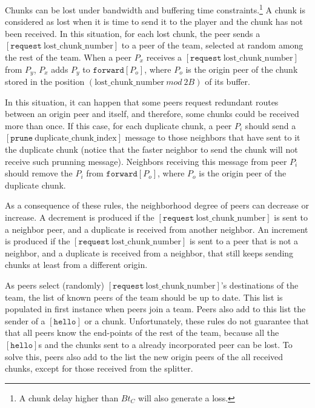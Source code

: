 

\label{sec:routes_discovery}

Chunks can be lost under bandwidth and buffering time
constraints.\footnote{A chunk delay higher than $Bt_C$ will also
  generate a loss.} A chunk is considered as lost when it is time to
send it to the player and the chunk has not been received.  In this
situation, for each lost chunk, the peer sends a
$[\mathtt{request}~\text{lost\_chunk\_number}]$ to a peer of the team,
selected at random among the rest of the team. When a peer $P_x$
receives a $[\mathtt{request}~\text{lost\_chunk\_number}]$ from $P_y$,
$P_x$ adds $P_y$ to $\mathtt{forward}[P_o]$, where $P_o$ is the origin
peer of the chunk stored in the position
$(\text{lost\_chunk\_number}~\mathit{mod}~2B)$ of its buffer.

In this situation, it can happen that some peers request redundant
routes between an origin peer and itself, and therefore, some chunks
could be received more than once. If this case, for each duplicate
chunk, a peer $P_i$ should send a
$[\mathtt{prune}~\text{duplicate\_chunk\_index}]$ message to those
neighbors that have sent to it the duplicate chunk (notice that the
faster neighbor to send the chunk will not receive such prunning
message). Neighbors receiving this message from peer $P_i$ should
remove the $P_i$ from $\mathtt{forward}[P_o]$, where $P_o$ is the
origin peer of the duplicate chunk.

As a consequence of these rules, the neighborhood degree of peers can
decrease or increase. A decrement is produced if the
$[\mathtt{request}~\text{lost\_chunk\_number}]$ is sent to a neighbor
peer, and a duplicate is received from another neighbor. An increment
is produced if the $[\mathtt{request}~\text{lost\_chunk\_number}]$ is
sent to a peer that is not a neighbor, and a duplicate is received
from a neighbor, that still keeps sending chunks at least from a
different origin.

As peers select (randomly)
$[\mathtt{request}~\text{lost\_chunk\_number}]$'s destinations of the
team, the list of known peers of the team should be up to date. This
list is populated in first instance when peers join a team. Peers also
add to this list the sender of a $[\mathtt{hello}]$ or a
chunk. Unfortunately, these rules do not guarantee that that all peers
know the end-points of the rest of the team, because all the
$[\mathtt{hello}]$s and the chunks sent to a already incorporated peer
can be lost. To solve this, peers also add to the list the new origin
peers of the all received chunks, except for those received from the
splitter.

